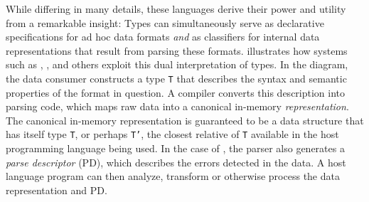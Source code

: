 


While differing in many details, 
these languages derive their power and utility from 
a remarkable insight: Types can simultaneously
serve as declarative specifications for ad hoc data formats 
{\em and} as classifiers for internal data representations 
that result from parsing these formats.
 illustrates how systems such as
\pads{}, \datascript, \packettypes{} and others exploit this
dual interpretation of types.  In the diagram,
the data consumer constructs a type {\tt T}
that describes the syntax and semantic properties of the format 
in question.  A compiler converts this
description into parsing code, which maps raw data into a canonical
in-memory {\em representation}.  
The canonical in-memory representation is guaranteed to be a data structure
that has itself type {\tt T}, or perhaps {\tt T'}, the closest relative of
{\tt T} available in the host programming language
being used.
In the case of \pads{}, the parser also generates a {\em parse 
descriptor} (PD), which
describes the errors detected in the data.  
A host language program can then analyze, transform or
otherwise process the data representation and PD. 

